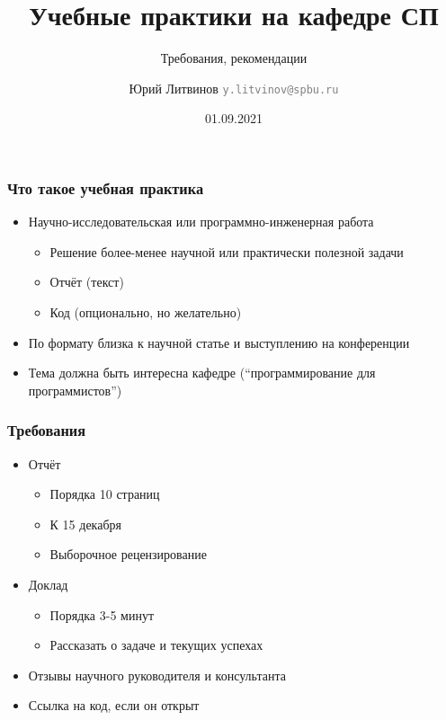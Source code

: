 \documentclass[xetex,mathserif,serif]{beamer}
\title{Учебные практики на кафедре СП}
\subtitle{Требования, рекомендации}
\author[Юрий Литвинов]{Юрий Литвинов \newline \textcolor{gray}{\small\texttt{y.litvinov@spbu.ru}}}
\date{01.09.2021}
\begin{document}
    
    \frame{\titlepage}

    \begin{frame}
        \frametitle{Что такое учебная практика}
        \begin{itemize}
            \item Научно-исследовательская или программно-инженерная работа
            \begin{itemize}
                \item Решение более-менее научной или практически полезной задачи
                \item Отчёт (текст)
                \item Код (опционально, но желательно)
            \end{itemize}
            \item По формату близка к научной статье и выступлению на конференции
            \item Тема должна быть интересна кафедре (``программирование для программистов'')
        \end{itemize}
    \end{frame}

    \begin{frame}
        \frametitle{Требования}
        \begin{itemize}
            \item Отчёт
            \begin{itemize}
                \item Порядка 10 страниц
                \item К 15 декабря
                \item Выборочное рецензирование
            \end{itemize}
            \item Доклад
            \begin{itemize}
                \item Порядка 3-5 минут
                \item Рассказать о задаче и текущих успехах
            \end{itemize}
            \item Отзывы научного руководителя и консультанта
            \item Ссылка на код, если он открыт
        \end{itemize}
    \end{frame}
\end{document}
